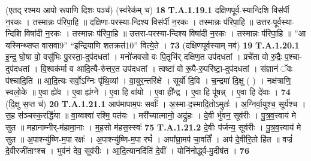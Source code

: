 \documentclass[17pt]{extarticle}
\begin{document}
                (एतद् रश्मय आपो रूपाणि दिशः पञ्च॑) \newline
                                      (स्व॑रेक॑म् च) \textbf{18} \newline \newline
                                \textbf{ T.A.1.19.1} \newline
                  दक्षिणपूर्व-स्यान्दिशि विस॑र्पी न॒रकः । तस्मान्नः प॑रिपा॒हि ॥  दक्षिणा-परस्या-न्दिश्य विस॑र्पी न॒रकः ।  तस्मान्नः प॑रिपा॒हि ॥  उत्तर-पूर्वस्या-न्दिशि विषा॑दी न॒रकः ।  तस्मान्नः प॑रिपा॒हि ॥  उत्तरा-परस्या-न्दिश्य विषा॑दी न॒रकः ।  तस्मान्नः प॑रिपा॒हि ॥  ”आ यस्मिन्थ्सप्त वासवा{9}” “इन्द्रियाणि शतक्रत॑{10}” वित्ये॒ते । \textbf{ 73} \newline
                  \newline
                                                        (दक्षिणपूर्वस्याम् नव॑) \textbf{19} \newline \newline
                                \textbf{ T.A.1.20.1} \newline
                  इ॒न्द्र॒ घो॒षा वो॒ वसु॑भिः पु॒रस्ता॒-दुप॑दधतां ।  मनो॑जवसो वः पि॒तृभि॑र् दक्षिण॒त उप॑दधतां ।  प्रचे॑ता वो रु॒द्रैः प॒श्चा-दुप॑दधतां ।  वि॒श्वक॑र्मा व आदि॒त्यै-रु॑त्तर॒त उप॑दधतां । त्वष्टा॑ वो रू॒पै-रु॒परि॑ष्टा॒-दुप॑दधतां । संज्ञानं ॅवः प॑श्चादि॒ति ॥ आ॒दि॒त्यः सर्वो॒ऽग्निः पृ॑थि॒व्यां । वा॒युर॒न्तरि॑क्षे । सूर्यो॑ दि॒वि ।  च॒न्द्रमा॑ दि॒क्षु ( ) । नक्ष॑त्राणि॒ स्वलो॒के ॥ ए॒वा ह्ये॑व । ए॒वा ह्य॑ग्ने । ए॒वा हि वा॑यो । ए॒वा ही᳚न्द्र । ए॒वा हि पू॑षन्न् । ए॒वा हि दे॑वाः । \textbf{ 74} \newline
                  \newline
                                                        (दि॒क्षु स॒प्त च॑) \textbf{20} \newline \newline
                                \textbf{ T.A.1.21.1} \newline
                  आप॑मापाम॒पः सर्वाः᳚ । अ॒स्मा-द॒स्मादि॒तोऽमुतः॑ ।  अ॒ग्निर्वा॒युश्च॒ सूर्य॑श्च । स॒ह स॑ञ्चस्क॒रर्द्धि॑या ॥  वा॒य्वश्वा॑ रश्मि॒ पत॑यः । मरी᳚च्यात्मानो॒ अद्रु॑हः ।  दे॒वी र्भु॑वन॒ सूव॑रीः । पु॒त्र॒व॒त्त्वाय॑ मे सुत ॥  महानाम्नीर्-म॑हामा॒नाः । म॒ह॒सो म॑हस॒स्स्वः॑ \textbf{ 75} \newline
                  \newline
                                                                  \textbf{ T.A.1.21.2} \newline
                  दे॒वीः प॑र्जन्य॒ सूव॑रीः । पु॒त्र॒व॒त्त्वाय॑ मे सुत ॥  अ॒पाश्न्यु॑ष्णि-म॒पा रक्षः॑ । अ॒पाश्न्यु॑ष्णि-म॒पा रघं᳚ । अपा᳚घ्रा॒मप॑ चा॒वर्तिं᳚ । अप॑ दे॒वीरि॒तो हि॑त ॥  वज्रं॑ दे॒वीरजी॑ताꣳश्च । भुव॑नं देव॒ सूव॑रीः । आ॒दि॒त्यानदि॑तिं दे॒वीं । योनि॑नोर्द्ध्व-मु॒दीष॑त । \textbf{ 76} \newline
\end{document}
